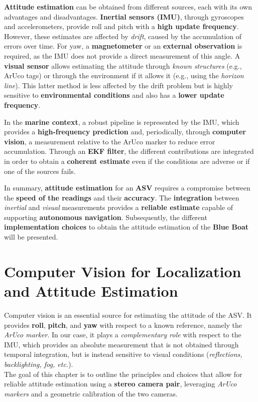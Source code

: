 \textbf{Attitude estimation} can be obtained from different sources, each with its own advantages and disadvantages. \textbf{Inertial sensors (IMU)}\cite{IMU_Euler}, through gyroscopes and accelerometers, provide roll and pitch with a \textbf{high update frequency}. However, these estimates are affected by \textit{drift}, caused by the accumulation of errors over time. For yaw, a \textbf{magnetometer} or an \textbf{external observation} is required, as the IMU does not provide a direct measurement of this angle. A \textbf{visual sensor} allows estimating the attitude through \textit{known structures} (e.g., ArUco tags) or through the environment if it allows it (e.g., using the \textit{horizon line}). This latter method is less affected by the drift problem but is highly sensitive to \textbf{environmental conditions} and also has a \textbf{lower update frequency}.  

In the \textbf{marine context}, a robust pipeline is represented by the IMU, which provides a \textbf{high-frequency prediction} and, periodically, through \textbf{computer vision}, a measurement relative to the ArUco marker to reduce error accumulation. Through an \textbf{EKF filter}\cite{EKS_IMU_cv}, the different contributions are integrated in order to obtain a \textbf{coherent estimate} even if the conditions are adverse or if one of the sources fails.  

In summary, \textbf{attitude estimation} for an \textbf{ASV} requires a compromise between the \textbf{speed of the readings} and their \textbf{accuracy}. The \textbf{integration} between \textit{inertial} and \textit{visual} measurements provides a \textbf{reliable estimate} capable of supporting \textbf{autonomous navigation}. Subsequently, the different \textbf{implementation choices} to obtain the attitude estimation of the \textbf{Blue Boat} will be presented.  

\section{Computer Vision for Localization and Attitude Estimation}

Computer vision is an essential source for estimating the attitude of the ASV. 
It provides \textbf{roll}, \textbf{pitch}, and \textbf{yaw} with respect to a known reference, 
namely the \textit{ArUco marker}. In our case, it plays a \textit{complementary role} with respect to the IMU, 
which provides an absolute measurement that is not obtained through temporal integration, 
but is instead sensitive to visual conditions (\textit{reflections, backlighting, fog, etc.}).\\
The goal of this chapter is to outline the principles and choices that allow for reliable 
attitude estimation using a \textbf{stereo camera pair}, leveraging \textit{ArUco markers} 
and a geometric calibration of the two cameras.\\

